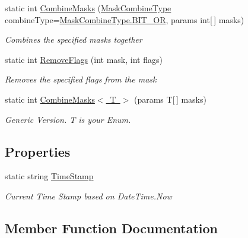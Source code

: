 \begin{DoxyCompactItemize}
static int \mbox{\hyperlink{class_a_d_l_1_1_utils_a75c77c4689775aca5a14e1e046e289fc}{Combine\+Masks}} (\mbox{\hyperlink{namespace_a_d_l_a887d1db091d273083278875e32842128}{Mask\+Combine\+Type}} combine\+Type=\mbox{\hyperlink{namespace_a_d_l_a887d1db091d273083278875e32842128a377da01fa3eaa9e9d6a69a2fa415fe7b}{Mask\+Combine\+Type.\+B\+I\+T\+\_\+\+OR}}, params int\mbox{[}$\,$\mbox{]} masks)
\begin{DoxyCompactList}\small\item\em Combines the specified masks together \end{DoxyCompactList}\item 
static int \mbox{\hyperlink{class_a_d_l_1_1_utils_ac01ab97bc36cb231f4f06cadce9b2aa5}{Remove\+Flags}} (int mask, int flags)
\begin{DoxyCompactList}\small\item\em Removes the specified flags from the mask \end{DoxyCompactList}\item 
static int \mbox{\hyperlink{class_a_d_l_1_1_utils_af62716f1f25f794bbd3212966610baed}{Combine\+Masks$<$ T $>$}} (params T\mbox{[}$\,$\mbox{]} masks)
\begin{DoxyCompactList}\small\item\em Generic Version. T is your Enum. \end{DoxyCompactList}\end{DoxyCompactItemize}
\subsection*{Properties}
\begin{DoxyCompactItemize}
\item 
static string \mbox{\hyperlink{class_a_d_l_1_1_utils_a93a1013d16031cf968a4383b56f4b24f}{Time\+Stamp}}
\begin{DoxyCompactList}\small\item\em Current Time Stamp based on Date\+Time.\+Now \end{DoxyCompactList}\end{DoxyCompactItemize}


\subsection{Member Function Documentation}
\mbox{\label{class_a_d_l_1_1_utils_a75c77c4689775aca5a14e1e046e289fc}} 
